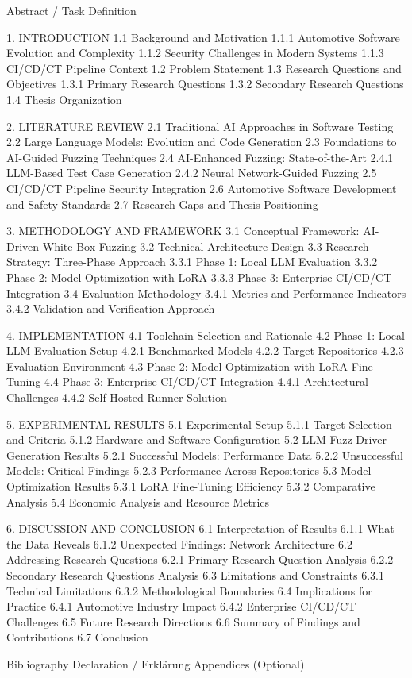 Abstract / Task Definition

1. INTRODUCTION
    1.1 Background and Motivation
        1.1.1 Automotive Software Evolution and Complexity
        1.1.2 Security Challenges in Modern Systems
        1.1.3 CI/CD/CT Pipeline Context
    1.2 Problem Statement
    1.3 Research Questions and Objectives
        1.3.1 Primary Research Questions
        1.3.2 Secondary Research Questions
    1.4 Thesis Organization

2. LITERATURE REVIEW
    2.1 Traditional AI Approaches in Software Testing
    2.2 Large Language Models: Evolution and Code Generation
    2.3 Foundations to AI-Guided Fuzzing Techniques
    2.4 AI-Enhanced Fuzzing: State-of-the-Art
        2.4.1 LLM-Based Test Case Generation
        2.4.2 Neural Network-Guided Fuzzing
    2.5 CI/CD/CT Pipeline Security Integration
    2.6 Automotive Software Development and Safety Standards
    2.7 Research Gaps and Thesis Positioning

3. METHODOLOGY AND FRAMEWORK
    3.1 Conceptual Framework: AI-Driven White-Box Fuzzing
    3.2 Technical Architecture Design
    3.3 Research Strategy: Three-Phase Approach
        3.3.1 Phase 1: Local LLM Evaluation
        3.3.2 Phase 2: Model Optimization with LoRA
        3.3.3 Phase 3: Enterprise CI/CD/CT Integration
    3.4 Evaluation Methodology
        3.4.1 Metrics and Performance Indicators
        3.4.2 Validation and Verification Approach

4. IMPLEMENTATION
    4.1 Toolchain Selection and Rationale
    4.2 Phase 1: Local LLM Evaluation Setup
        4.2.1 Benchmarked Models
        4.2.2 Target Repositories
        4.2.3 Evaluation Environment
    4.3 Phase 2: Model Optimization with LoRA Fine-Tuning
    4.4 Phase 3: Enterprise CI/CD/CT Integration
        4.4.1 Architectural Challenges
        4.4.2 Self-Hosted Runner Solution

5. EXPERIMENTAL RESULTS
    5.1 Experimental Setup
        5.1.1 Target Selection and Criteria
        5.1.2 Hardware and Software Configuration
    5.2 LLM Fuzz Driver Generation Results
        5.2.1 Successful Models: Performance Data
        5.2.2 Unsuccessful Models: Critical Findings
        5.2.3 Performance Across Repositories
    5.3 Model Optimization Results
        5.3.1 LoRA Fine-Tuning Efficiency
        5.3.2 Comparative Analysis
    5.4 Economic Analysis and Resource Metrics

6. DISCUSSION AND CONCLUSION
    6.1 Interpretation of Results
        6.1.1 What the Data Reveals
        6.1.2 Unexpected Findings: Network Architecture
    6.2 Addressing Research Questions
        6.2.1 Primary Research Question Analysis
        6.2.2 Secondary Research Questions Analysis
    6.3 Limitations and Constraints
        6.3.1 Technical Limitations
        6.3.2 Methodological Boundaries
    6.4 Implications for Practice
        6.4.1 Automotive Industry Impact
        6.4.2 Enterprise CI/CD/CT Challenges
    6.5 Future Research Directions
    6.6 Summary of Findings and Contributions
    6.7 Conclusion

Bibliography
Declaration / Erklärung
Appendices (Optional)